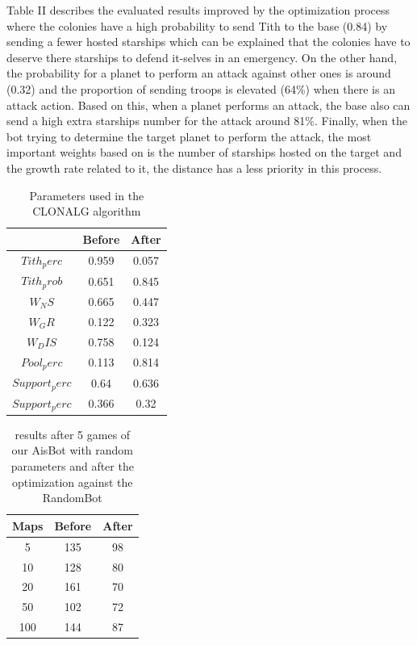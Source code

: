 \documentclass[conference]{IEEEtran}
\begin{document}
Table II describes the evaluated results improved by the optimization process where the colonies have a high probability to send Tith to the base (0.84) by sending a fewer hosted starships which can be explained that the colonies have to deserve there starships to defend it-selves in an emergency. On the other hand, the probability for a planet to perform an attack against other ones is around (0.32) and the proportion of sending troops is elevated (64\%) when there is an attack action. Based on this, when a planet performs an attack, the base also can send a high extra starships number for the attack around 81\%. Finally, when the bot trying to determine the target planet to perform the attack, the most important weights based on is the number of starships hosted on the target and the growth rate related to it, the distance has a less priority in this process. \\

\begin{table}[!h]
\centering
\begin{tabular}{|c|c|c|}
\hline
 & Before & After \\
 \hline
 $Tith_perc$ & 0.959 & 0.057 \\
 \hline
 $Tith_prob$ & 0.651 & 0.845 \\
 \hline
 $W_NS$ & 0.665 & 0.447 \\
 \hline
 $W_GR$ & 0.122 & 0.323 \\
 \hline
 $W_DIS$ & 0.758 & 0.124 \\
 \hline
 $Pool_perc$ & 0.113 & 0.814 \\
 \hline
 $Support_perc$ & 0.64 & 0.636 \\
 \hline
 $Support_perc$ & 0.366 & 0.32 \\
 \hline 
\end{tabular}
\caption{Parameters used in the CLONALG algorithm}
\label{TABLE 2}
\end{table}

\begin{table}[!h]
\centering
\begin{tabular}{|c|c|c|}
\hline
 Maps & Before & After \\ 
 \hline
 5 & 135 & 98 \\ 
 \hline
 10 & 128 & 80 \\
 \hline
 20 & 161 & 70 \\
 \hline
 50 & 102 & 72 \\
 \hline
 100 & 144 & 87 \\
 \hline
\end{tabular}
\caption{results after 5 games of our AisBot with random parameters and after the optimization against the RandomBot}
\label{TABLE 3}
\end{table}
\end{document}
